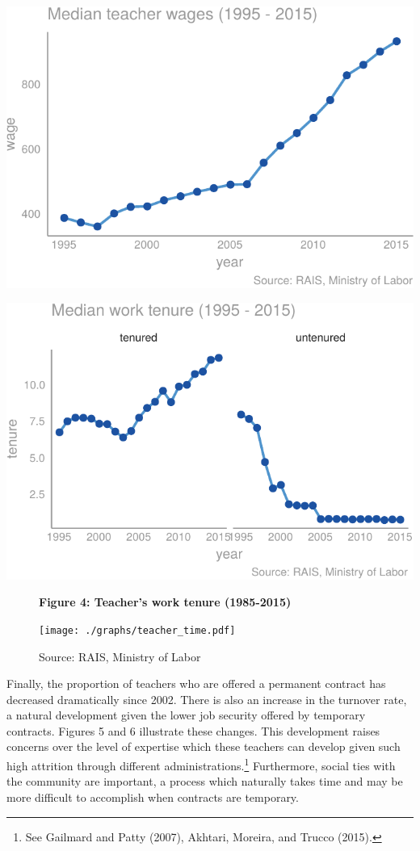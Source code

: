 \documentclass[12pt,]{article}
\let\rmarkdownfootnote\footnote%
\def\footnote{\protect\rmarkdownfootnote}
\begin{document}
\begin{center}\includegraphics{dissertation_files/figure-latex/unnamed-chunk-20-1} \end{center}

\begin{center}\includegraphics{dissertation_files/figure-latex/unnamed-chunk-21-1} \end{center}

\begin{figure}
    \centering
    \textbf{\small Figure 4: Teacher's work tenure (1985-2015)}\par\medskip
    \texttt{[image: ./graphs/teacher\_time.pdf]}
    \caption*{\footnotesize \hfill Source: RAIS, Ministry of Labor}
\end{figure}

Finally, the proportion of teachers who are offered a permanent contract
has decreased dramatically since 2002. There is also an increase in the
turnover rate, a natural development given the lower job security
offered by temporary contracts. Figures 5 and 6 illustrate these
changes. This development raises concerns over the level of expertise
which these teachers can develop given such high attrition through
different administrations.\footnote{See Gailmard and Patty (2007),
  Akhtari, Moreira, and Trucco (2015).} Furthermore, social ties with
the community are important, a process which naturally takes time and
may be more difficult to accomplish when contracts are temporary.
\end{document}
